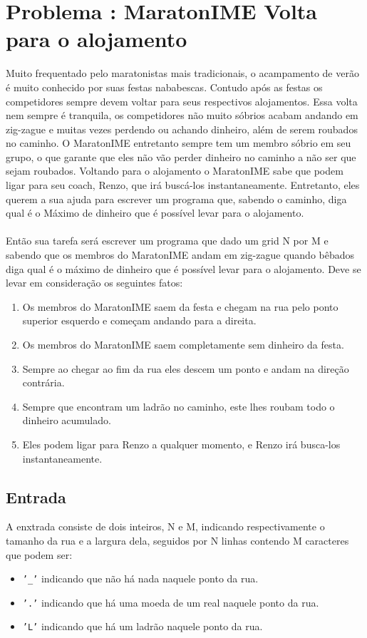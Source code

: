 \section*{Problema \proxLetra: MaratonIME Volta para o alojamento}

Muito frequentado pelo maratonistas mais tradicionais, o acampamento de verão é muito conhecido por suas festas nababescas. Contudo após as festas os competidores sempre devem voltar para seus respectivos alojamentos. Essa volta nem sempre é tranquila, os competidores não muito sóbrios acabam andando em zig-zague e muitas vezes perdendo ou achando dinheiro, além de serem roubados no caminho. O MaratonIME entretanto sempre tem um membro sóbrio em seu grupo, o que garante que eles não vão perder dinheiro no caminho a não ser que sejam roubados. Voltando para o alojamento o MaratonIME sabe que podem ligar para seu coach, Renzo, que irá buscá-los instantaneamente. Entretanto, eles querem a sua ajuda para escrever um programa que, sabendo o caminho, diga qual é o Máximo de dinheiro que é possível levar para o alojamento.\\
\\
Então sua tarefa será escrever um programa que dado um grid N por M e sabendo que os membros do MaratonIME andam em zig-zague quando bêbados diga qual é o máximo de dinheiro que é possível levar para o alojamento. Deve se levar em consideração os seguintes fatos:\\
\begin{enumerate}
    \item Os membros do MaratonIME saem da festa e chegam na rua pelo ponto superior esquerdo e começam andando para a direita.
    \item Os membros do MaratonIME saem completamente sem dinheiro da festa.
    \item Sempre ao chegar ao fim da rua eles descem um ponto e andam na direção contrária.
    \item Sempre que encontram um ladrão no caminho, este lhes roubam todo o dinheiro acumulado.
    \item Eles podem ligar para Renzo a qualquer momento, e Renzo irá busca-los instantaneamente.
\end{enumerate}
\subsection*{Entrada}
\textoDiversasInstanciasEOF

A enxtrada consiste de dois inteiros, N e M, indicando respectivamente o tamanho da rua e a largura dela, seguidos por N linhas contendo M caracteres que podem ser:\\
\begin{itemize}
    \item \texttt{'\_'} indicando que não há nada naquele ponto da rua.
    \item \texttt{'.'} indicando que há uma moeda de um real naquele ponto da rua.
    \item \texttt{'L'} indicando que há um ladrão naquele ponto da rua.
\end{itemize}

